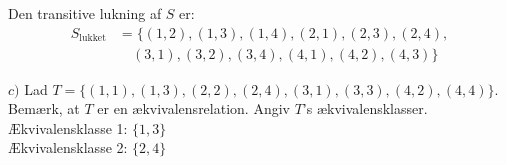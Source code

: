 \documentclass{article}
\begin{document}
Den transitive lukning af $S$ er:
\begin{align*}
    S_{\text{lukket}} &= \{(1,2),(1,3),(1,4),(2,1),(2,3),(2,4), \\
    &\quad (3,1),(3,2),(3,4),(4,1),(4,2),(4,3)\}
\end{align*}

\noindent
$c)$ Lad $T=\{(1,1),(1,3),(2,2),(2,4),(3,1),(3,3),(4,2),(4,4)\}$.
Bemærk, at $T$ er en ækvivalensrelation.
Angiv $T$'s ækvivalensklasser. \\

\noindent
Ækvivalensklasse 1: $\{1,3\}$ \\
Ækvivalensklasse 2: $\{2,4\}$

\newpage
\end{document}
